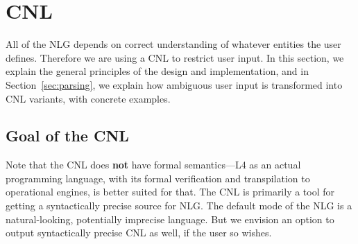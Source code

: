 \documentclass[11pt]{article}
\begin{document}
\section{CNL}
\label{sec:cnl}

All of the NLG depends on correct understanding of whatever entities the user defines. Therefore we are using a CNL to restrict user input. %
In this section, we explain the general principles of the design and implementation, and in Section~\ref{sec:parsing}, we explain how ambiguous user input is transformed into CNL variants, with concrete examples.


\subsection{Goal of the CNL}
Note that the CNL does {\bf not} have formal semantics---L4 as an actual programming language, with its formal verification and transpilation to operational engines, is better suited for that. 
The CNL is primarily a tool for getting a syntactically precise source for NLG.
The default mode of the NLG is a natural-looking, potentially imprecise language. But we envision an option to output syntactically precise CNL as well, if the user so wishes. %



\end{document}
